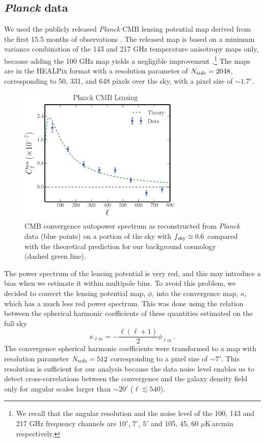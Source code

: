 \subsection{\emph{Planck} data}
\label{subsec:planckxc1}
We used the publicly released \emph{Planck} \gls{CMB} lensing potential map derived from the first 15.5 months of observations \citep{Ade2014c}. The released map is based on a minimum variance combination of the 143 and 217 GHz temperature anisotropy maps only, because adding the 100 GHz map yields a negligible improvement \citep{Ade2014c}.\footnote{We recall that the angular resolution and the noise level  of the 100, 143 and 217 GHz frequency channels are $10'$, $7'$, $5'$ and 105, 45, 60 $\mu$K\,arcmin respectively.} The maps are in the HEALPix format with a resolution parameter of $N_{\rm side} = 2048$, corresponding to 50, 331, and 648 pixels over the sky, with a pixel size of $\sim 1.7'$.

\begin{figure} %
\centering %
\includegraphics[width=0.7\textwidth]{Chapter3/Images/f3}
\caption{\gls{CMB} convergence autopower spectrum as reconstructed from \emph{Planck} data (blue points) on a portion of the sky with $f_{\rm{sky}} \simeq 0.6$ compared with the theoretical prediction for our background cosmology (dashed green line).
 \label{fig:kk_data_planck}}
\end{figure}

The power spectrum of the lensing potential is very red, and this may introduce a bias when we estimate it within multipole bins. To avoid this problem, we decided to convert the lensing potential map, $\phi$, into the convergence map, $\kappa$, which has a much less red power spectrum.
This was done using the relation between the spherical harmonic coefficients of these quantities estimated on the full sky \citep{Hu2000}
\begin{equation}
\kappa_{\ell m} = -\frac{\ell(\ell+1)}{2}\phi_{\ell m} \ .
\end{equation}
The convergence spherical harmonic coefficients were transformed to a map with resolution parameter $N_{\rm side}=512$ corresponding to a pixel size of $\sim 7'$. This resolution is sufficient for our analysis because the data noise level enables us to detect cross-correlations between the convergence and the galaxy density field only for angular scales larger than $\sim 20'$ ($\ell \lesssim 540$).


